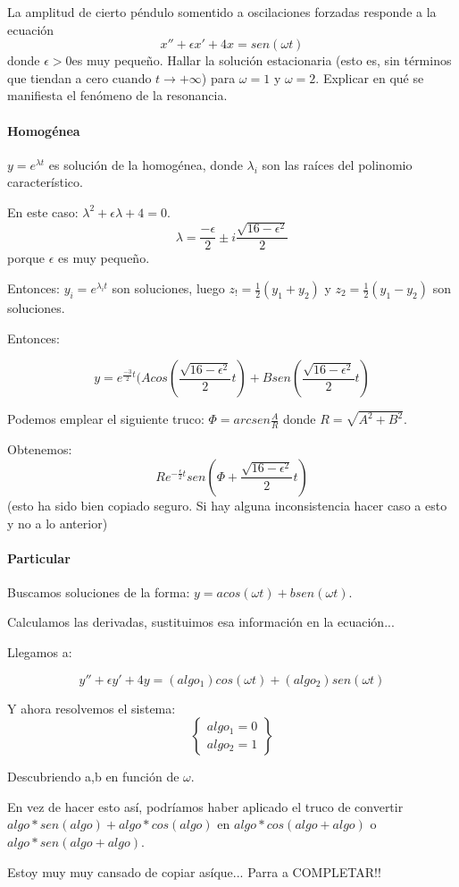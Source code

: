 \documentclass[nochap]{apuntes}
\begin{document}
\begin{problem}[18]
 La amplitud de cierto péndulo somentido a oscilaciones forzadas responde a la ecuación
\[x''+\epsilon x'+4x=sen(\omega t)\]
donde $\epsilon> 0 $es muy pequeño. Hallar la solución estacionaria (esto es, sin términos que tiendan a cero cuando $t → +∞$) para $\omega = 1$ y $\omega = 2$. Explicar en qué se manifiesta el fenómeno de la resonancia.
\solution
\paragraph{Homogénea}

$y = e^{\lambda t}$ es solución de la homogénea, donde $\lambda_i$ son las raíces del polinomio característico.

En este caso: $\lambda^2 + \epsilon \lambda + 4 = 0$.
\[\lambda = \frac{-\epsilon}{2} \pm i \frac{\sqrt{16-\epsilon^2}}{2}\] porque $\epsilon$ es muy pequeño.

Entonces: $y_i = e^{\lambda_i t}$ son soluciones, luego $z_!=\frac{1}{2}(y_1+y_2)$ y $z_2 = \frac{1}{2}(y_1-y_2)$ son soluciones.

Entonces:

\[y=e^{\frac{-3}{2}t}(Acos\left(\frac{\sqrt{16-\epsilon^2}}{2}t\right) + Bsen\left(\frac{\sqrt{16-\epsilon^2}}{2}t\right)\]

Podemos emplear el siguiente truco: $\Phi = arcsen\frac{A}{R} $ donde $R = \sqrt{A^2+B^2}$.

Obtenemos: \[R e^{-\frac{\epsilon}{2}t} sen\left(\Phi + \frac{\sqrt{16-\epsilon^2}}{2}t\right)\] (esto ha sido bien copiado seguro. Si hay alguna inconsistencia hacer caso a esto y no a lo anterior)


\paragraph{Particular} Buscamos soluciones de la forma: $y=acos(\omega t) + b sen(\omega t)$.

Calculamos las derivadas, sustituimos esa información en la ecuación...

Llegamos a:

\[y''+\epsilon y' +4y=(algo_1)cos(\omega t) + (algo_2) sen(\omega t)\]

Y ahora resolvemos el sistema:
\[\left\{\begin{array}{cc}
algo_1=0\\
algo_2=1
\end{array}\right\}\]

Descubriendo a,b en función de $\omega$.

En vez de hacer esto así, podríamos haber aplicado el truco de convertir $algo*sen(algo) + algo*cos(algo)$ en $algo*cos(algo + algo)$ o $algo*sen(algo+algo)$. 

Estoy muy muy cansado de copiar asíque... Parra a COMPLETAR!!



\end{problem}
\end{document}
